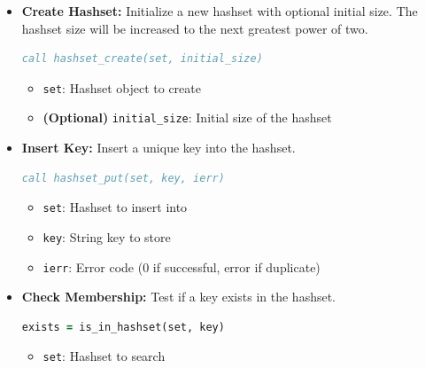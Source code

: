 \begin{enumerate}
\begin{enumerate}
\begin{itemize}
                    \item \textbf{Create Hashset:} Initialize a new hashset with
                          optional initial size. The hashset size will be increased to the next
                          greatest power of two.
                          \begin{lstlisting}[language=Fortran]
call hashset_create(set, initial_size)
                          \end{lstlisting}
                          \begin{itemize}
                            \item \texttt{set}: Hashset object to create
                                  
                            \item \textbf{(Optional)} \texttt{initial\_size}: Initial size
                                  of the hashset
                          \end{itemize}
                          
                    \item \textbf{Insert Key:} Insert a unique key into the hashset. 
                    \begin{lstlisting}[language=Fortran]
call hashset_put(set, key, ierr)
                    \end{lstlisting}
                    \begin{itemize}
                        \item \texttt{set}: Hashset to insert into
                              
                        \item \texttt{key}: String key to store
                              
                        \item \texttt{ierr}: Error code (0 if successful, error if duplicate)
                    \end{itemize}
                    
                    \item \textbf{Check Membership:} Test if a key exists in the hashset.
                          \begin{lstlisting}[language=Fortran]
exists = is_in_hashset(set, key)
                          \end{lstlisting}
                          \begin{itemize}
                            \item \texttt{set}: Hashset to search
                                  

\end{itemize}
\end{itemize}
\end{enumerate}
\end{enumerate}

